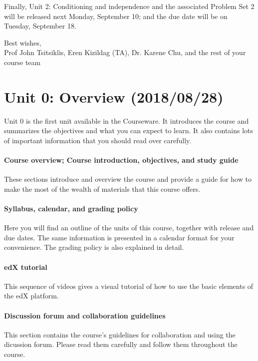 \documentclass[pdftex, brazil, 12pt, twoside]{article}
\begin{document}
Finally, Unit 2: Conditioning and independence and the associated Problem Set 2 will
be released next Monday, September 10; and the due date will be on Tuesday,
September 18.
 
Best wishes,\\
Prof John Tsitsiklis, Eren Kizildag (TA), Dr. Karene Chu, and the rest of your course team 




\newpage
\section{Unit 0: Overview (2018/08/28)}
\label{ovw0}

Unit 0 is the first unit available in the Courseware. It introduces the course and
summarizes the objectives and what you can expect to learn. It also contains lots
of important information that you should read over carefully.

\paragraph{Course overview; Course introduction, objectives, and study guide}
These sections introduce and overview the course and provide a guide for how to
make the most of the wealth of materials that this course offers.

\paragraph{Syllabus, calendar, and grading policy}
Here you will find an outline of the units of this course, together with release
and due dates. The same information is presented in a calendar format for your
convenience. The grading policy is also explained in detail.

\paragraph{edX tutorial}
This sequence of videos gives a visual tutorial of how to use the basic elements
of the edX platform.

\paragraph{Discussion forum and collaboration guidelines}
This section contains the course's guidelines for collaboration and using the
dicussion forum. Please read them carefully and follow them throughout the course.
\end{document}
